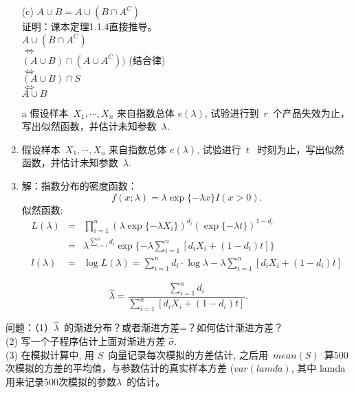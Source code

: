 \documentclass [12pt]{article}
\def\la{\lambda}
\def\x1n{{X_1,\cdots, X_n}}
\def\sig{{\sigma}}
\newcommand{\sumn}[1]{\sum\limits_{#1=1}^n}
\newcommand{\timn}[1]{\prod\limits_{#1=1}^n}
\def\la{\lambda}
\def\sig{\sigma}
\begin{document}
\begin{CJK*}{GBK}{kai}
\begin{enumerate}
   \item[(c)] $A \cup B = A \cup (B \cap A^{C})$\\
   证明：课本定理1.1.4直接推导。\\
   $ A \cup (B \cap A^{C})$\\
   $\Leftrightarrow$\\
   $(A \cup B) \cap (A \cup A^{C}))$ (结合律)\\
   $\Leftrightarrow$\\
   $(A \cup B) \cap S$\\
   $\Leftrightarrow$\\
   $A \cup B $
\end{enumerate}

\begin{enumerate}
  \item[a] 假设样本~$\x1n$ 来自指数总体 $e(\lambda)$,
  试验进行到~$r$~个产品失效为止，写出似然函数，并估计未知参数~$\lambda$.
  \item   假设样本~$\x1n$ 来自指数总体 $e(\lambda)$,
  试验进行~$t$~ 时刻为止，写出似然函数，并估计未知参数~$\lambda$.
  \item 解：指数分布的密度函数：
$$f(x;\lambda)=\lambda \exp\{-\lambda x\} I(x>0).$$
似然函数:
\begin{eqnarray*}
  L(\lambda)&=&\timn i \left({\lambda \exp\{-\lambda X_i\}}\right)^{d_i} (\exp\{-\lambda t\})^{1-d_i} \\
   &=& \lambda^{ \sumn i d_i} \exp\{-\lambda \sumn i [d_i X_i+(1-d_i)t]\}\\
  l(\la)&=&\log L(\la)=\sumn i d_i \cdot \log \la -\la \sumn i [d_i X_i+(1-d_i)t]
\end{eqnarray*}

\end{enumerate}



$$ \hat{\la}=\frac{\sumn i d_i}{\sumn i [d_i X_i+(1-d_i)t]}.$$

问题：（1）$\hat{\la}$~的渐进分布？或者渐进方差=？如何估计渐进方差？\\
(2) 写一个子程序估计上面对渐进方差 $\hat{\sig}$.\\
(3) 在模拟计算中, 用 $S$~向量记录每次模拟的方差估计,
之后用~$mean(S)$~算500次模拟的方差的平均值，与参数估计的真实样本方差
($var(lamda)$, 其中 lamda 用来记录500次模拟的参数$\la$~的估计。



  \end{CJK*}
\end{document}
